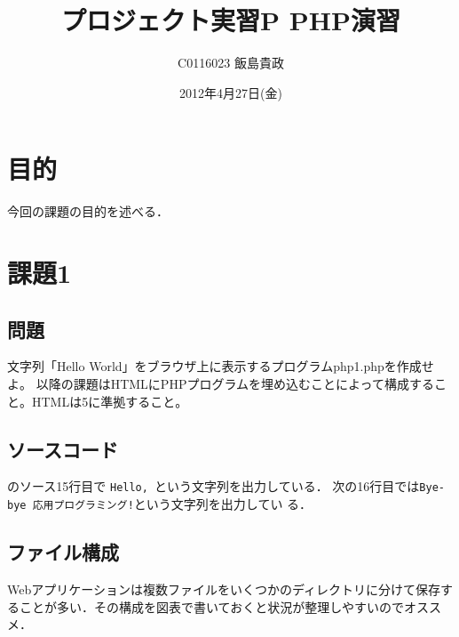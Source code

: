 \documentclass[a4j,10pt]{jsarticle}
\title{プロジェクト実習P PHP演習}
\author{C0116023 飯島貴政}
\date{2012年4月27日(金)}
\begin{document}
\maketitle
\lstset{
    breaklines = true,
    breakindent = 10pt,
    basicstyle = \ttfamily\scriptsize,
    classoffset = 0,
    frame = TBrl,
    framesep = 5pt,
    numbers = left,
    stepnumber = 1,
    numberstyle = \tiny,
    tabsize = 4,
    captionpos = t
}

\section{目的}

今回の課題の目的を述べる．


\section{課題1}

\subsection{問題}

文字列「Hello World」をブラウザ上に表示するプログラムphp1.phpを作成せよ。
以降の課題はHTMLにPHPプログラムを埋め込むことによって構成すること。HTMLは5に準拠すること。


\subsection{ソースコード}



のソース15行目で {\tt Hello, }という文字列を出力している．
次の16行目では{\tt Bye-bye 応用プログラミング!}という文字列を出力してい
る．

\subsection{ファイル構成}


Webアプリケーションは複数ファイルをいくつかのディレクトリに分けて保存す
ることが多い．その構成を図表で書いておくと状況が整理しやすいのでオススメ．
\end{document}
